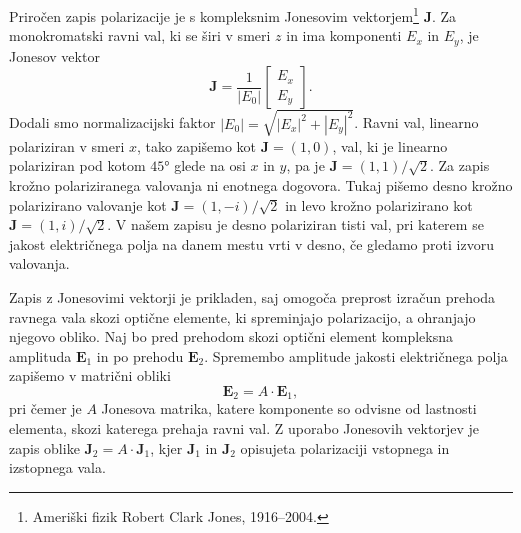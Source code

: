 Priročen zapis polarizacije je s kompleksnim Jonesovim 
vektorjem\footnote{Ameriški fizik Robert Clark Jones, 1916--2004.}
$\mathbf{J}$. Za monokromatski ravni val, ki se širi v smeri $z$ in ima 
komponenti $E_x$ in $E_y$, je Jonesov vektor
\begin{equation}
\mathbf{J}=\frac{1}{|E_{0}|}\left[\begin{array}{c}
E_{x}\\
E_{y}
\end{array}\right].
\end{equation}
Dodali smo normalizacijski faktor $|E_{0}|=\sqrt{|E_{x}|^{2}+|E_{y}|^{2}}$.
Ravni val, linearno polariziran v smeri $x$, tako zapišemo kot $\mathbf{J}=\left(1,0\right)$,
val, ki je linearno polariziran pod kotom $\ang{45}$ glede na osi
$x$ in $y$, pa je $\mathbf{J}=\left(1,1\right)/\sqrt{2}$.
Za zapis krožno polariziranega valovanja ni enotnega dogovora. Tukaj pišemo
desno krožno polarizirano valovanje kot 
$\mathbf{J}=\left(1,-i\right)/\sqrt{2}$ in
levo krožno polarizirano kot $\mathbf{J}=\left(1,i\right)/\sqrt{2}$.
V našem zapisu je desno polariziran tisti val, pri katerem se jakost električnega
polja na danem mestu vrti v desno, če gledamo proti izvoru valovanja. 

Zapis z Jonesovimi vektorji je prikladen, saj omogoča preprost izračun
prehoda ravnega vala skozi optične elemente, ki spreminjajo polarizacijo,
a ohranjajo njegovo obliko. Naj bo pred prehodom skozi optični element kompleksna
amplituda $\mathbf{E}_1$ in po prehodu $\mathbf{E}_2$. Spremembo amplitude 
jakosti električnega polja zapišemo v matrični obliki
\begin{equation}
\mathbf{E}_{2}=A\cdot\mathbf{E}_{1},
\end{equation}
pri čemer je $A$ Jonesova matrika, katere komponente so odvisne od
lastnosti elementa, skozi katerega prehaja ravni val. 
Z uporabo Jonesovih vektorjev je zapis oblike $\mathbf{J}_{2}=A\cdot\mathbf{J}_{1}$, 
kjer $\mathbf{J}_{1}$ in $\mathbf{J}_{2}$ opisujeta polarizaciji vstopnega in izstopnega vala. 

